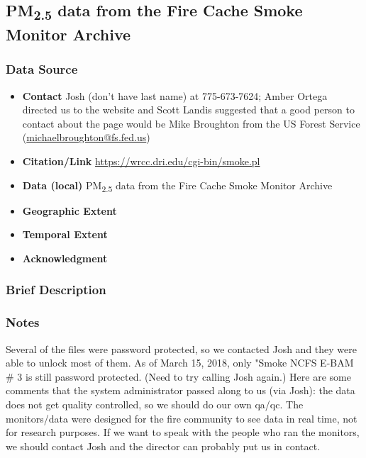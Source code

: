 \subsection{\texorpdfstring{PM\textsubscript{2.5}}{} data from the Fire Cache Smoke Monitor Archive}

\subsubsection*{Data Source}

\begin{itemize}[nolistsep]
\item \textbf{Contact} Josh (don't have last name) at 775-673-7624; Amber Ortega directed us to the website and Scott Landis suggested that a good person to contact about the page would be Mike Broughton from the US Forest Service (\url{michaelbroughton@fs.fed.us})
\item \textbf{Citation/Link} \url{https://wrcc.dri.edu/cgi-bin/smoke.pl}
\item \textbf{Data (local)} PM\textsubscript{2.5} data from the Fire Cache Smoke Monitor Archive
\item \textbf{Geographic Extent}
\item \textbf{Temporal Extent}
\item \textbf{Acknowledgment}
\end{itemize}

\subsubsection*{Brief Description}

\subsubsection*{Notes}

Several of the files were password protected, so we contacted Josh and they were able to unlock most of them. As of March 15, 2018, only "Smoke NCFS E-BAM \# 3 is still password protected. (Need to try calling Josh again.) Here are some comments that the system administrator passed along to us (via Josh): the data does not get quality controlled, so we should do our own qa/qc. The monitors/data were designed for the fire community to see data in real time, not for research purposes. If we want to speak with the people who ran the monitors, we should contact Josh and the director can probably put us in contact.

